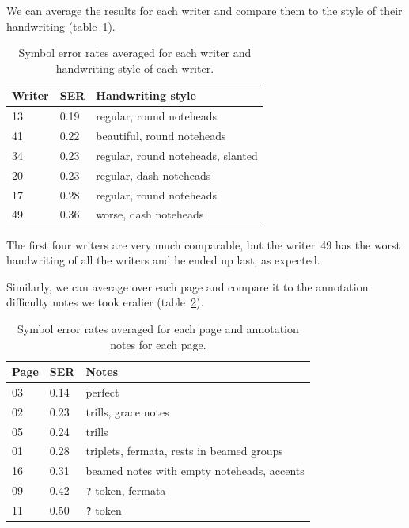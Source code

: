 We can average the results for each writer and compare them to the style of their handwriting (table~\ref{tab6:SerAverageForWriters}).

\newpage

\begin{table}[h] \centering
\begin{tabular}{lll}
\toprule
\textbf{Writer} & \textbf{SER} & \textbf{Handwriting style} \\
\midrule
13 & 0.19 & regular, round noteheads          \\
41 & 0.22 & beautiful, round noteheads        \\
34 & 0.23 & regular, round noteheads, slanted \\
20 & 0.23 & regular, dash noteheads           \\
17 & 0.28 & regular, round noteheads          \\
49 & 0.36 & worse, dash noteheads             \\
\bottomrule
\end{tabular}
\caption{Symbol error rates averaged for each writer and handwriting style of each writer.}
\label{tab6:SerAverageForWriters}
\end{table}

The first four writers are very much comparable, but the writer~49 has the worst handwriting of all the writers and he ended up last, as expected.

Similarly, we can average over each page and compare it to the annotation difficulty notes we took eralier (table~\ref{tab6:SerAverageForPages}).

\begin{table}[h] \centering
\begin{tabular}{lll}
\toprule
\textbf{Page} & \textbf{SER} & \textbf{Notes} \\
\midrule
03 & 0.14 & perfect                                    \\
02 & 0.23 & trills, grace notes                        \\
05 & 0.24 & trills                                     \\
01 & 0.28 & triplets, fermata, rests in beamed groups  \\
16 & 0.31 & beamed notes with empty noteheads, accents \\
09 & 0.42 & \verb`?` token, fermata                    \\
11 & 0.50 & \verb`?` token                             \\
\bottomrule
\end{tabular}
\caption{Symbol error rates averaged for each page and annotation notes for each page.}
\label{tab6:SerAverageForPages}
\end{table}

